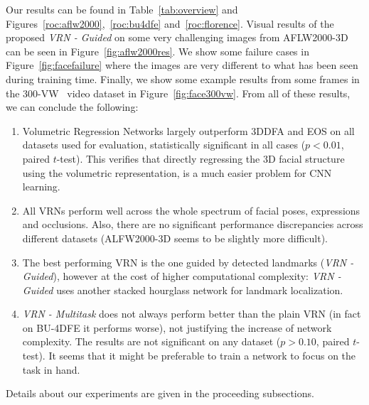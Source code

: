 Our results can be found in Table~\ref{tab:overview} and
Figures~\ref{roc:aflw2000},~\ref{roc:bu4dfe} and~\ref{roc:florence}.
Visual results of the proposed \textit{VRN - Guided} on some very
challenging images from AFLW2000-3D can be seen in
Figure~\ref{fig:aflw2000res}. We show some failure cases in
Figure~\ref{fig:facefailure} where the images are very different to
what has been seen during training time. Finally, we show some example
results from some frames in the 300-VW~\cite{sagonas2013300} video
dataset in Figure~\ref{fig:face300vw}. From all of these results, we
can conclude the following:
\begin{enumerate}
\item Volumetric Regression Networks largely outperform 3DDFA and EOS
  on all datasets used for evaluation, statistically significant in
  all cases ($p < 0.01$, paired $t$-test). This verifies that directly
  regressing the 3D facial structure using the volumetric
  representation, is a much easier problem for CNN learning.
\item All VRNs perform well across the whole spectrum of facial poses,
  expressions and occlusions. Also, there are no significant performance
  discrepancies across different datasets (ALFW2000-3D seems to be
  slightly more difficult).
\item The best performing VRN is the one guided by detected landmarks
  (\textit{VRN - Guided}), however at the cost of higher computational
  complexity: \textit{VRN - Guided} uses another stacked hourglass
  network for landmark localization.
\item \textit{VRN - Multitask} does not always perform better than the
  plain VRN (in fact on BU-4DFE it performs worse), not justifying the
  increase of network complexity. The results are not significant on
  any dataset ($p > 0.10$, paired $t$-test).  It seems that it might
  be preferable to train a network to focus on the task in hand.
\end{enumerate}

\noindent Details about our experiments are given in the proceeding subsections.




